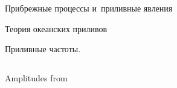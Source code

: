 \begin{chapter}{Прибрежные процессы и~приливные явления}
\begin{section}{Теория океанских приливов}
\begin{paragraph}{Приливные частоты.}
\begin{table} [b!]
\begin{tabular*}{121mm}{@{\extracolsep{\fill}}lcccccccc@{}}
\hline
\end{tabular*}
{\footnotesize{\dag Amplitudes from~\cite{Apel:1987}}}
\end{table}
%

\end{paragraph}
\end{section}
\end{chapter}
